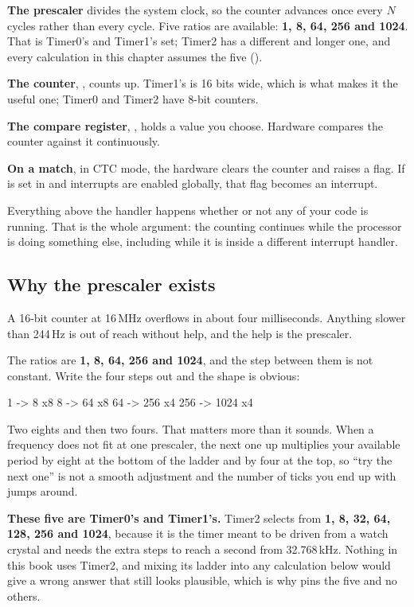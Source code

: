 \textbf{The prescaler} divides the system clock, so the counter advances once every $N$ cycles
rather than every cycle. Five ratios are available: \textbf{1, 8, 64, 256 and 1024}. That is
Timer0's and Timer1's set; Timer2 has a different and longer one, and every calculation in this
chapter assumes the five ().

\textbf{The counter}, , counts up. Timer1's is 16 bits wide, which is what makes it the
useful one; Timer0 and Timer2 have 8-bit counters.

\textbf{The compare register}, , holds a value you choose. Hardware compares the
counter against it continuously.

\textbf{On a match}, in CTC mode, the hardware clears the counter and raises a flag. If
 is set in  and interrupts are enabled globally, that flag becomes an
interrupt.

Everything above the handler happens whether or not any of your code is running. That is the whole
argument: the counting continues while the processor is doing something else, including while it
is inside a different interrupt handler.

\subsection{Why the prescaler exists}
\label{c5:sec:prescaler}
A 16-bit counter at 16\,MHz overflows in about four milliseconds. Anything slower than 244\,Hz is
out of reach without help, and the help is the prescaler.

The ratios are \textbf{1, 8, 64, 256 and 1024}, and the step between them is not constant. Write
the four steps out and the shape is obvious:

\begin{console}
    1 -> 8      x8
    8 -> 64     x8
   64 -> 256    x4
  256 -> 1024   x4
\end{console}

Two eights and then two fours. That matters more than it sounds. When a frequency does not fit at
one prescaler, the next one up multiplies your available period by eight at the bottom of the
ladder and by four at the top, so ``try the next one'' is not a smooth adjustment and the number of
ticks you end up with jumps around.

\textbf{These five are Timer0's and Timer1's.} Timer2 selects from \textbf{1, 8, 32, 64, 128, 256
and 1024}, because it is the timer meant to be driven from a watch crystal and needs the extra steps
to reach a second from 32.768\,kHz. Nothing in this book uses Timer2, and mixing its ladder into
any calculation below would give a wrong answer that still looks plausible, which is why
 pins the five and no others.

